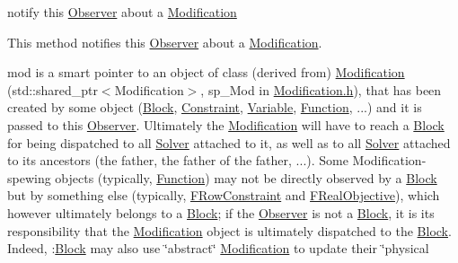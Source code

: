 notify this \mbox{\hyperlink{class_s_m_spp__di__unipi__it_1_1_observer}{Observer}} about a \mbox{\hyperlink{class_s_m_spp__di__unipi__it_1_1_modification}{Modification}} 

This method notifies this \mbox{\hyperlink{class_s_m_spp__di__unipi__it_1_1_observer}{Observer}} about a \mbox{\hyperlink{class_s_m_spp__di__unipi__it_1_1_modification}{Modification}}.

mod is a smart pointer to an object of class (derived from) \mbox{\hyperlink{class_s_m_spp__di__unipi__it_1_1_modification}{Modification}} (std\+::shared\+\_\+ptr$<$\+Modification$>$, sp\+\_\+\+Mod in \mbox{\hyperlink{_modification_8h}{Modification.\+h}}), that has been created by some object (\mbox{\hyperlink{class_s_m_spp__di__unipi__it_1_1_block}{Block}}, \mbox{\hyperlink{class_s_m_spp__di__unipi__it_1_1_constraint}{Constraint}}, \mbox{\hyperlink{class_s_m_spp__di__unipi__it_1_1_variable}{Variable}}, \mbox{\hyperlink{class_s_m_spp__di__unipi__it_1_1_function}{Function}}, ...) and it is passed to this \mbox{\hyperlink{class_s_m_spp__di__unipi__it_1_1_observer}{Observer}}. Ultimately the \mbox{\hyperlink{class_s_m_spp__di__unipi__it_1_1_modification}{Modification}} will have to reach a \mbox{\hyperlink{class_s_m_spp__di__unipi__it_1_1_block}{Block}} for being dispatched to all \mbox{\hyperlink{class_s_m_spp__di__unipi__it_1_1_solver}{Solver}} attached to it, as well as to all \mbox{\hyperlink{class_s_m_spp__di__unipi__it_1_1_solver}{Solver}} attached to its ancestors (the father, the father of the father, ...). Some Modification-\/spewing objects (typically, \mbox{\hyperlink{class_s_m_spp__di__unipi__it_1_1_function}{Function}}) may not be directly observed by a \mbox{\hyperlink{class_s_m_spp__di__unipi__it_1_1_block}{Block}} but by something else (typically, \mbox{\hyperlink{class_s_m_spp__di__unipi__it_1_1_f_row_constraint}{F\+Row\+Constraint}} and \mbox{\hyperlink{class_s_m_spp__di__unipi__it_1_1_f_real_objective}{F\+Real\+Objective}}), which however ultimately belongs to a \mbox{\hyperlink{class_s_m_spp__di__unipi__it_1_1_block}{Block}}; if the \mbox{\hyperlink{class_s_m_spp__di__unipi__it_1_1_observer}{Observer}} is not a \mbox{\hyperlink{class_s_m_spp__di__unipi__it_1_1_block}{Block}}, it is its responsibility that the \mbox{\hyperlink{class_s_m_spp__di__unipi__it_1_1_modification}{Modification}} object is ultimately dispatched to the \mbox{\hyperlink{class_s_m_spp__di__unipi__it_1_1_block}{Block}}. Indeed, \+:\mbox{\hyperlink{class_s_m_spp__di__unipi__it_1_1_block}{Block}} may also use \char`\"{}abstract\char`\"{} \mbox{\hyperlink{class_s_m_spp__di__unipi__it_1_1_modification}{Modification}} to update their \char`\"{}physical
